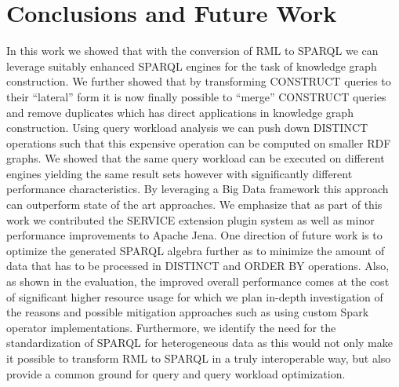 \section{Conclusions and Future Work}
\label{sec:conclusions}
In this work we showed that with the conversion of RML to SPARQL we can leverage suitably enhanced SPARQL engines for the task of knowledge graph construction.
We further showed that by transforming CONSTRUCT queries to their ``lateral'' form it is now finally possible to ``merge'' CONSTRUCT queries and remove duplicates which has direct applications in knowledge graph construction.
Using query workload analysis we can push down DISTINCT operations such that this expensive operation can be computed on smaller RDF graphs.
We showed that the same query workload can be executed on different engines yielding the same result sets however with significantly different performance characteristics. By leveraging a Big Data framework this approach can outperform state of the art approaches.
We emphasize that as part of this work we contributed the SERVICE extension plugin system as well as minor performance improvements
to Apache Jena.
One direction of future work is to optimize the generated SPARQL algebra further as to minimize the amount of data that has to be processed in DISTINCT and ORDER BY operations. Also, as shown in the evaluation, the improved overall performance comes at the cost of significant higher resource usage for which we plan in-depth investigation of the reasons and possible mitigation approaches such as using custom Spark operator implementations.
Furthermore, we identify the need for the standardization of SPARQL for heterogeneous data as this would not only make it possible to transform RML to SPARQL in a truly interoperable way, but also provide a common ground for query and query workload optimization.

%


